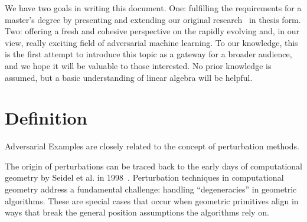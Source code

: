 \documentclass[a4paper, oneside]{discothesis}
\begin{document}
We have two goals in writing this document. One: fulfilling the requirements for a master's degree by presenting and extending our original research~\cite{jabary2024seeing} in thesis form. Two: offering a fresh and cohesive perspective on the rapidly evolving and, in our view, really exciting field of adversarial machine learning. To our knowledge, this is the first attempt to introduce this topic as a gateway for a broader audience, and we hope it will be valuable to those interested. No prior knowledge is assumed, but a basic understanding of linear algebra will be helpful.

\section{Definition}

Adversarial Examples are closely related to the concept of perturbation methods.

The origin of perturbations can be traced back to the early days of computational geometry by Seidel et al. in 1998~\cite{seidel1998nature}. Perturbation techniques in computational geometry address a fundamental challenge: handling ``degeneracies'' in geometric algorithms. These are special cases that occur when geometric primitives align in ways that break the general position assumptions the algorithms rely on.
\end{document}
